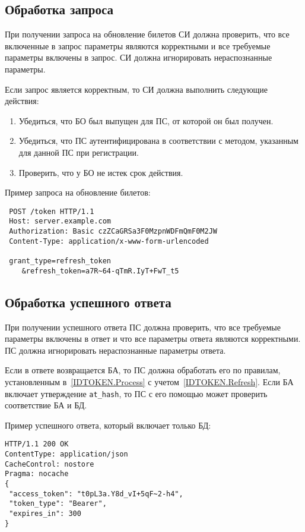 \label{REQRESP.Refresh}

\subsection{Обработка запроса}\label{REQRESP.Refresh.Req}

При получении запроса на обновление билетов СИ должна проверить, что все 
включенные в запрос параметры являются корректными и все требуемые параметры 
включены в запрос.
%
СИ должна игнорировать нераспознанные параметры.

Если запрос является корректным, то СИ должна выполнить следующие действия:
\begin{enumerate}
\item 
Убедиться, что БО был выпущен для ПС, от которой он был получен.

\item 
Убедиться, что ПС аутентифицирована в соответствии с методом, указанным 
для данной ПС при регистрации.

\item 
Проверить, что у БО не истек срок действия.
\end{enumerate}

Пример запроса на обновление билетов:
\begin{lstlisting}
 POST /token HTTP/1.1
 Host: server.example.com
 Authorization: Basic czZCaGRSa3F0MzpnWDFmQmF0M2JW
 Content-Type: application/x-www-form-urlencoded

 grant_type=refresh_token
    &refresh_token=a7R~64-qTmR.IyT+FwT_t5
\end{lstlisting}

\subsection{Обработка успешного ответа}\label{REQRESP.Refresh.Resp}

При получении успешного ответа ПС должна проверить, что все
требуемые параметры включены в ответ и что все параметры ответа являются
корректными. ПС должна игнорировать нераспознанные параметры ответа.

Если в ответе возвращается БА, то ПС должна обработать его по правилам, 
установленным в~\ref{IDTOKEN.Process} с учетом~\ref{IDTOKEN.Refresh}. 
%
Если БА включает утверждение \lstinline{at_hash}, то ПС с его помощью 
может проверить соответствие БА и БД.

Пример успешного ответа, который включает только БД:
%
\begin{lstlisting}
HTTP/1.1 200 OK
ContentType: application/json
CacheControl: nostore
Pragma: nocache
{
 "access_token": "t0pL3a.Y8d_vI+5qF~2-h4",
 "token_type": "Bearer",
 "expires_in": 300
}
\end{lstlisting}

